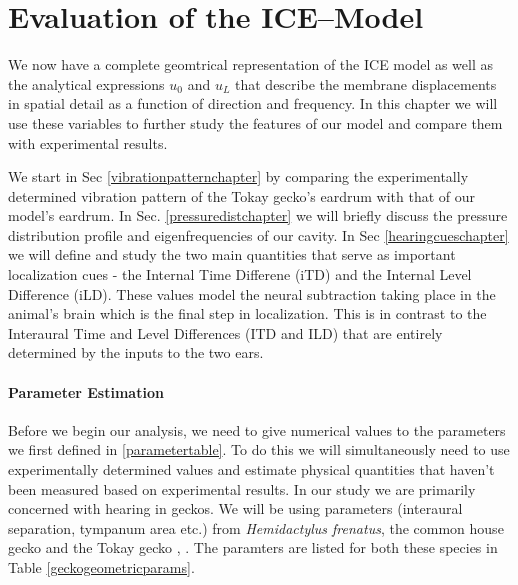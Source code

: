 \chapter{Evaluation of the ICE--Model}\label{modelanalysis}
We now have a complete geomtrical representation of the ICE model as well as
 the analytical expressions $u_0$ and $u_L$ that describe the membrane displacements
in spatial detail as a function of direction and frequency. In this chapter we will use these variables
to further study the features of our model and compare them with experimental results.

We start in Sec \ref{vibrationpatternchapter} by comparing the experimentally determined vibration pattern
of the Tokay gecko's eardrum with that of our model's eardrum. In Sec. \ref{pressuredistchapter} we will
briefly discuss the pressure distribution profile and eigenfrequencies of our cavity.
In Sec \ref{hearingcueschapter} we will define and study the two main quantities that serve as important localization
cues - the Internal Time Differene (iTD) and the Internal Level Difference (iLD). These values model the
neural subtraction taking place in the animal's brain which is the final step in localization. This
is in contrast to the Interaural Time and Level Differences (ITD and ILD) that are
entirely determined by the inputs to the two ears.


\subsubsection{Parameter Estimation}
Before we begin our analysis, we need to give numerical values to the parameters we first defined
in \ref{parametertable}. To do this we will simultaneously need to use experimentally determined
values and estimate physical quantities that haven't been measured based on experimental results. 
In our study we are primarily concerned with hearing in geckos. We will be using
parameters (interaural separation, tympanum area etc.) from \textit{Hemidactylus frenatus}, the common house gecko
\cite{dalsgaardmanley2}
and the Tokay gecko \cite{dalsgaardmanley1}, \cite{dalsgaardtangcarr}. The paramters are listed for both these
species in Table \ref{geckogeometricparams}.

